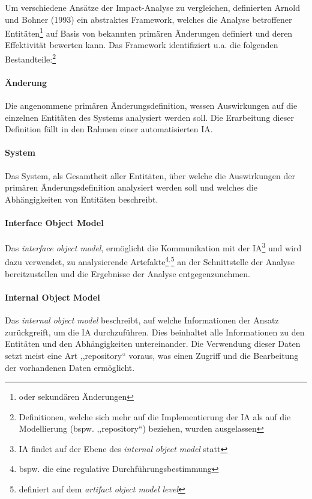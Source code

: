 \medskip
Um verschiedene Ansätze der Impact-Analyse zu vergleichen, definierten Arnold und Bohner (1993) \cite{app_bohner} ein abstraktes Framework, welches die Analyse betroffener Entitäten\footnote{oder sekundären Änderungen} auf Basis von bekannten primären Änderungen definiert und deren Effektivität bewerten kann.
\cite[22]{app_lindvall}
Das Framework identifiziert u.a. die folgenden Bestandteile:\footnote{Definitionen, welche sich mehr auf die Implementierung der \ac{IA} als auf die Modellierung (bspw. ,,repository``) beziehen, wurden ausgelassen}

\paragraph{Änderung}
    Die angenommene primären Änderungsdefinition,\hspace{1pt} wessen Auswirkungen auf die einzelnen Entitäten des Systems analysiert werden soll.
    Die Erarbeitung dieser Definition fällt in den Rahmen einer automatisierten \ac{IA}. 

\paragraph{System}
    Das System, als Gesamtheit aller Entitäten, über welche die Auswirkungen der primären Änderungsdefinition analysiert werden soll und welches die Abhängigkeiten von Entitäten beschreibt.

\paragraph{Interface Object Model}
    Das \textit{interface object model}, ermöglicht die Kommunikation mit der \ac{IA}\footnote{\ac{IA} findet auf der Ebene des \textit{internal object model} statt} und wird dazu verwendet, zu analysierende Artefakte\footnote{bspw. die eine regulative Durchführungsbestimmung}$^,$\footnote{definiert auf dem \textit{artifact object model level}} an der Schnittstelle der Analyse bereitzustellen und die Ergebnisse der Analyse entgegenzunehmen.  

\paragraph{Internal Object Model}
    Das \textit{internal object model} beschreibt, auf welche Informationen der Ansatz zurückgreift, um die \ac{IA} durchzuführen.
    Dies beinhaltet alle Informationen zu den Entitäten und den Abhängigkeiten untereinander.
    Die Verwendung dieser Daten setzt meist eine Art ,,repository`` voraus, was einen Zugriff und die Bearbeitung der vorhandenen Daten ermöglicht. \cite[295]{app_bohner}


